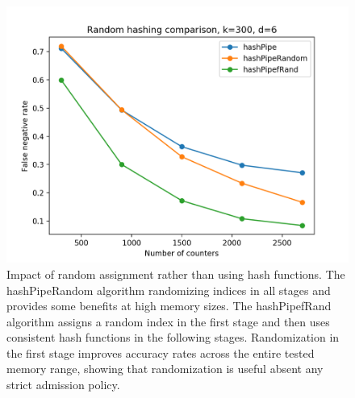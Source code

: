 \begin{figure}[!htb]
  \centering
    \includegraphics[scale=0.5]{interview}
     \caption{Impact of random assignment rather than using hash functions. The hashPipeRandom algorithm randomizing indices in all stages and provides some benefits at high memory sizes. The hashPipefRand algorithm assigns a random index in the first stage and then uses consistent hash functions in the following stages. Randomization in the first stage improves accuracy rates across the entire tested memory range, showing that randomization is useful absent any strict admission policy.}
     \label{fig:interview}
\end{figure}
